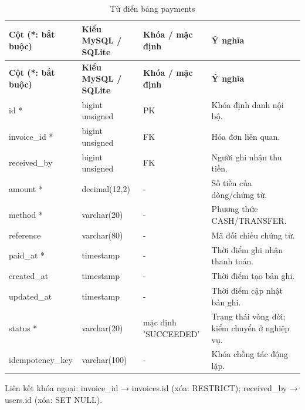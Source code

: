 {\fontsize{10}{12}\selectfont\setlength{\tabcolsep}{3pt}\renewcommand{\arraystretch}{1.12}
\begin{longtable}{@{}L{\textwidth-4.86pt\relax} L{\textwidth-3.96pt\relax} L{\textwidth-2.88pt\relax} L{\textwidth-6.3pt\relax}@{}}
\caption{Từ điển bảng payments}\\
\toprule
\textbf{Cột (*:\allowbreak{} bắt buộc)} & \textbf{Kiểu My\allowbreak{}SQL /\allowbreak{} SQLite} & \textbf{Khóa /\allowbreak{} mặc định} & \textbf{Ý nghĩa}\\\midrule
\endfirsthead
\toprule
\textbf{Cột (*:\allowbreak{} bắt buộc)} & \textbf{Kiểu My\allowbreak{}SQL /\allowbreak{} SQLite} & \textbf{Khóa /\allowbreak{} mặc định} & \textbf{Ý nghĩa}\\\midrule
\endhead
\bottomrule\endlastfoot
id * & bigint unsigned & PK & Khóa định danh nội bộ.\allowbreak{}\\[1pt]
invoice\_\allowbreak{}id * & bigint unsigned & FK & Hóa đơn liên quan.\allowbreak{}\\[1pt]
received\_\allowbreak{}by & bigint unsigned & FK & Người ghi nhận thu tiền.\allowbreak{}\\[1pt]
amount * & decimal(12,2) & - & Số tiền của dòng/\allowbreak{}chứng từ.\allowbreak{}\\[1pt]
method * & varchar(20) & - & Phương thức CASH/\allowbreak{}TRANSFER.\allowbreak{}\\[1pt]
reference & varchar(80) & - & Mã đối chiếu chứng từ.\allowbreak{}\\[1pt]
paid\_\allowbreak{}at * & timestamp & - & Thời điểm ghi nhận thanh toán.\allowbreak{}\\[1pt]
created\_\allowbreak{}at & timestamp & - & Thời điểm tạo bản ghi.\allowbreak{}\\[1pt]
updated\_\allowbreak{}at & timestamp & - & Thời điểm cập nhật bản ghi.\allowbreak{}\\[1pt]
status * & varchar(20) & mặc định 'SUCCEEDED' & Trạng thái vòng đời; kiểm chuyển ở nghiệp vụ.\allowbreak{}\\[1pt]
idempotency\_\allowbreak{}key & varchar(100) & - & Khóa chống tác động lặp.\allowbreak{}\\[1pt]
\end{longtable}}
Liên kết khóa ngoại:\allowbreak{} invoice\_\allowbreak{}id → invoices.\allowbreak{}id (xóa:\allowbreak{} RESTRICT); received\_\allowbreak{}by → users.\allowbreak{}id (xóa:\allowbreak{} SET NULL).\allowbreak{}

